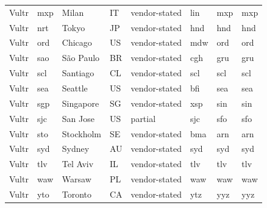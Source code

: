 \begin{longtable}{llllllll}
Vultr & mxp & Milan & IT & vendor-stated & lin & mxp & mxp \\
Vultr & nrt & Tokyo & JP & vendor-stated & hnd & hnd & hnd \\
Vultr & ord & Chicago & US & vendor-stated & mdw & ord & ord \\
Vultr & sao & São Paulo & BR & vendor-stated & cgh & gru & gru \\
Vultr & scl & Santiago & CL & vendor-stated & scl & scl & scl \\
Vultr & sea & Seattle & US & vendor-stated & bfi & sea & sea \\
Vultr & sgp & Singapore & SG & vendor-stated & xsp & sin & sin \\
Vultr & sjc & San Jose & US & partial & sjc & sfo & sfo \\
Vultr & sto & Stockholm & SE & vendor-stated & bma & arn & arn \\
Vultr & syd & Sydney & AU & vendor-stated & syd & syd & syd \\
Vultr & tlv & Tel Aviv & IL & vendor-stated & tlv & tlv & tlv \\
Vultr & waw & Warsaw & PL & vendor-stated & waw & waw & waw \\
Vultr & yto & Toronto & CA & vendor-stated & ytz & yyz & yyz \\
\end{longtable}
